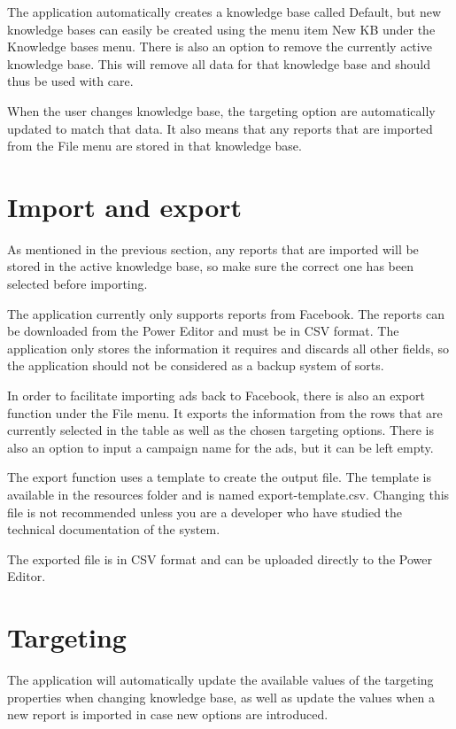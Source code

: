 \documentclass[11pt,twoside,a4paper]{article}
\begin{document}
The application automatically creates a knowledge base called Default, but new knowledge bases can easily be created using the menu item New KB under the Knowledge bases menu. There is also an option to remove the currently active knowledge base. This will remove all data for that knowledge base and should thus be used with care.

When the user changes knowledge base, the targeting option are automatically updated to match that data. It also means that any reports that are imported from the File menu are stored in that knowledge base.

\section{Import and export}
As mentioned in the previous section, any reports that are imported will be stored in the active knowledge base, so make sure the correct one has been selected before importing.

The application currently only supports reports from Facebook. The reports can be downloaded from the Power Editor and must be in CSV format. The application only stores the information it requires and discards all other fields, so the application should not be considered as a backup system of sorts.

In order to facilitate importing ads back to Facebook, there is also an export function under the File menu. It exports the information from the rows that are currently selected in the table as well as the chosen targeting options. There is also an option to input a campaign name for the ads, but it can be left empty.

The export function uses a template to create the output file. The template is available in the resources folder and is named export-template.csv. Changing this file is not recommended unless you are a developer who have studied the technical documentation of the system.

The exported file is in CSV format and can be uploaded directly to the Power Editor.

\section{Targeting}
The application will automatically update the available values of the targeting properties when changing knowledge base, as well as update the values when a new report is imported in case new options are introduced.
\end{document}

